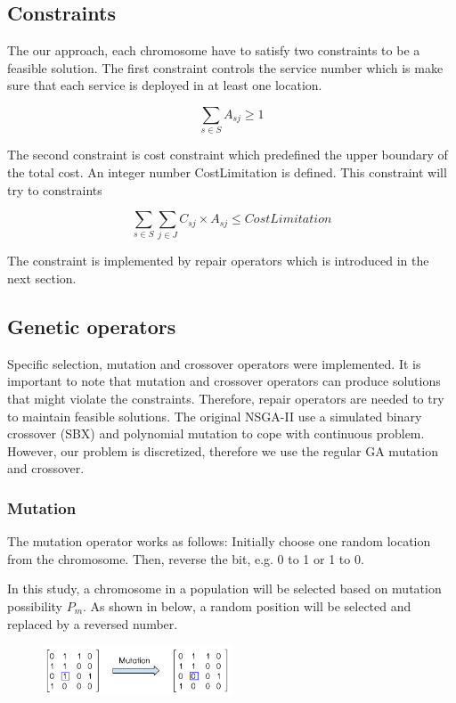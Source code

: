 \documentclass[twoside]{article}
\begin{document}
\subsection{Constraints}
The our approach, each chromosome have to satisfy two constraints to be a feasible solution.
The first constraint controls the service number which is make sure that each service is deployed in at 
least one location.
\begin{center}
	\begin{equation}
		\sum\limits_{s \in S} A_{sj} \geq 1
	\end{equation}
\end{center}

The second constraint is cost constraint which predefined the upper boundary of the total cost.
An integer number CostLimitation is defined. This constraint will try to constraints
\begin{center}
	\begin{equation}
		\sum\limits_{s \in S} \sum\limits_{j \in J} C_{sj} \times A_{sj} \leq CostLimitation
	\end{equation}
\end{center}
The constraint is implemented by repair operators which is introduced in the next section.

\subsection{Genetic operators}
Specific selection, mutation and crossover operators were implemented. It is important to note that mutation and 
crossover operators can produce solutions that might violate the constraints. Therefore, repair 
operators are needed to try to maintain feasible solutions. The original NSGA-II use a simulated 
binary crossover (SBX) \cite{930314} and polynomial mutation \cite{Raghuwanshi04} to cope with continuous problem. 
However, our problem is discretized, therefore we use the regular GA mutation and crossover.


\subsubsection{Mutation}
The mutation operator works as follows: Initially choose one random location from the chromosome. 
Then, reverse the bit, e.g. 0 to 1 or 1 to 0. 

In this study, a chromosome in a population will be selected based on mutation possibility $P_{m}$. 
As shown in below, a random position will be selected and replaced by a reversed number.
\begin{figure}[ht]
\centering
	\includegraphics[width=0.5\textwidth]{pics/mutation.png}
\caption{}
\label{graph1}
\end{figure}
\end{document}
